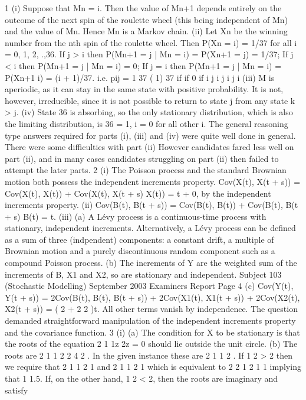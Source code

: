 1 (i) Suppose that Mn = i. Then the value of Mn+1 depends entirely on the outcome
of the next spin of the roulette wheel (this being independent of Mn) and the
value of Mn. Hence Mn is a Markov chain.
(ii) Let Xn be the winning number from the nth spin of the roulette wheel. Then
P(Xn = i) = 1/37 for all i = 0, 1, 2, .,36.
If j > i then P(Mn+1 = j | Mn = i) = P(Xn+1 = j) = 1/37;
If j < i then P(Mn+1 = j | Mn = i) = 0;
If j = i then P(Mn+1 = j | Mn = i) = P(Xn+1 i) = (i + 1)/37.
i.e. pij =
1
37
( 1)
37
if
if
0 if
i
j i
j i
j i
(iii) M is aperiodic, as it can stay in the same state with positive probability. It is
not, however, irreducible, since it is not possible to return to state j from any
state k > j.
(iv) State 36 is absorbing, so the only stationary distribution, which is also the
limiting distribution, is 36 = 1, i = 0 for all other i.
The general reasoning type answers required for parts (i), (iii) and (iv) were quite well done in
general. There were some difficulties with part (ii) However candidates fared less well on part (ii),
and in many cases candidates struggling on part (ii) then failed to attempt the later parts.
2 (i) The Poisson process and the standard Brownian motion both possess the
independent increments property.
Cov(X(t), X(t + s)) = Cov(X(t), X(t)) + Cov(X(t), X(t + s) X(t)) = t + 0, by
the independent increments property.
(ii) Cov(B(t), B(t + s)) = Cov(B(t), B(t)) + Cov(B(t), B(t + s) B(t) = t.
(iii) (a) A Lévy process is a continuous-time process with stationary,
independent increments. Alternatively, a Lévy process can be defined
as a sum of three (indpendent) components: a constant drift, a multiple
of Brownian motion and a purely discontinuous random component
such as a compound Poisson process.
(b) The increments of Y are the weighted sum of the increments of B, X1
and X2, so are stationary and independent.
Subject 103 (Stochastic Modelling) September 2003 Examiners Report
Page 4
(c) Cov(Y(t), Y(t + s)) = 2Cov(B(t), B(t), B(t + s)) + 2Cov(X1(t),
X1(t + s)) + 2Cov(X2(t), X2(t + s)) = ( 2 + 2 2 )t. All other terms
vanish by independence.
The question demanded straightforward manipulation of the independent increments
property and the covariance function.
3 (i) (a) The condition for X to be stationary is that the roots of the equation
2
1 1z 2z = 0
should lie outside the unit circle.
(b) The roots are
2
1 1 2
2
4
2
.
In the given instance these are 2
1 1 2 .
If 1
2 > 2 then we require that
2
1 1 2 1 and 2
1 1 2 1
which is equivalent to
2 2
1 2 1 1
implying that 1 1.5.
If, on the other hand, 1
2 < 2, then the roots are imaginary and satisfy

